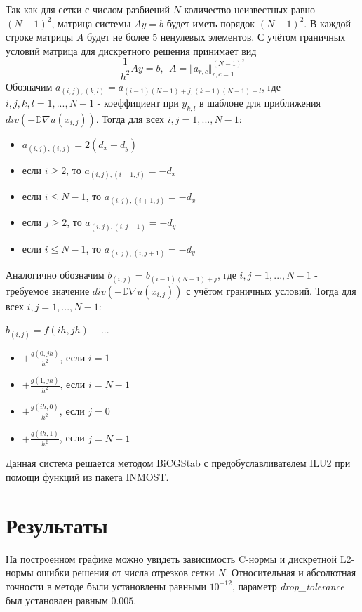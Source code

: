 \documentclass{article}
\begin{document}
Так как для сетки с числом разбиений $N$ количество неизвестных равно $(N - 1)^2$, матрица системы $Ay = b$ будет иметь порядок $(N - 1)^2$. В каждой строке матрицы $A$ будет не более 5 ненулевых элементов.
С учётом граничных условий матрица для дискретного решения принимает вид
$$\frac{1}{h^2}Ay = b, \ \ A = \Vert a_{r,c} \Vert_{r, c = 1}^{(N-1)^2}$$
Обозначим $a_{(i, j), (k, l)} = a_{(i-1)(N-1)+j, (k-1)(N-1) + l}$, где $i, j, k, l = 1, ... , N-1$ - коеффициент при $y_{k, l}$ в шаблоне для приближения $div(-\mathbb{D}\nabla u(x_{i, j}))$.
Тогда для всех $i, j = 1, ... , N-1$:
\begin{itemize}
  \item $a_{(i, j), (i, j)} = 2(d_x + d_y)$
  \item если $i \ge 2$, то $a_{(i, j), (i - 1, j)} = -d_x$
  \item если $i \le N - 1$, то $a_{(i, j), (i + 1, j)} = -d_x$
  \item если $j \ge 2$, то $a_{(i, j), (i, j - 1)} = -d_y$
  \item если $i \le N - 1$, то $a_{(i, j), (i, j + 1)} = -d_y$
\end{itemize}

Аналогично обозначим $b_{(i, j)} = b_{(i - 1)(N-1) + j}$, где $i, j = 1, ... , N-1$ - требуемое значение $div(-\mathbb{D}\nabla u(x_{i, j}))$ с учётом граничных условий.
Тогда для всех $i, j = 1, ... , N-1$:

$b_{(i, j)} = f(ih, jh) + ...$
\begin{itemize}
  \item $+ \frac{g(0, jh)}{h^2}$, если $i = 1$
  \item $+ \frac{g(1, jh)}{h^2}$, если $i = N-1$
  \item $+ \frac{g(ih, 0)}{h^2}$, если $j = 0$
  \item $+ \frac{g(ih, 1)}{h^2}$, если $j = N-1$
\end{itemize}

Данная система решается методом BiCGStab с предобуславливателем ILU2 при помощи функций из пакета INMOST.

\section{Результаты}

На построенном графике можно увидеть зависимость C-нормы и дискретной L2-нормы ошибки решения от числа отрезков сетки $N$. Относительная и абсолютная точности в методе были установлены равными $10^{-12}$, параметр \textit{drop\_tolerance} был установлен равным $0.005$.
\end{document}
